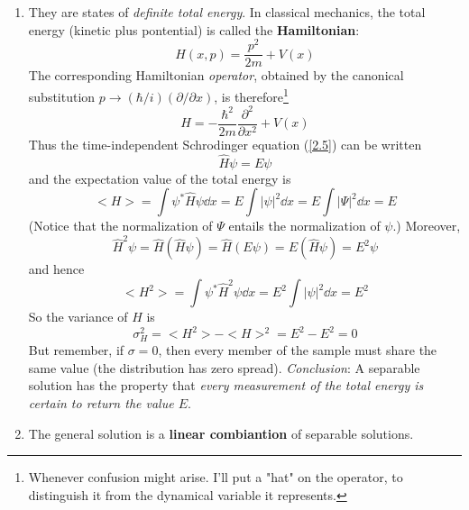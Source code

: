 \begin{enumerate}
\item They are states of \textit{definite total energy}. In classical mechanics, the total energy (kinetic plus pontential) is called the \textbf{Hamiltonian}:
	\begin{equation}\label{2.10}
	H(x,p)=\frac{p^2}{2m}+V(x)
\end{equation}
The corresponding Hamiltonian \textit{operator}, obtained by the canonical substitution $p\to (\hbar/i)(\partial /\partial x)$, is therefore\footnote{Whenever confusion might arise. I'll put a "hat" on the operator, to distinguish it from the dynamical variable it represents.}
\begin{equation}\label{2.11}
	\hat{H}=-\frac{\hbar^2}{2m}\frac{\partial^2}{\partial x^2}+V(x)
\end{equation}
Thus the time-independent Schrodinger equation (\ref{2.5}) can be written
\begin{equation}\label{2.12}
	\hat{H}\psi=E\psi
\end{equation}
and the expectation value of the total energy is
\begin{equation}\label{2.13}
	<H>=\int\psi^*\hat{H}\psi\dd x=E\int |\psi|^2\dd x=E\int |\Psi|^2\dd x=E
\end{equation}
(Notice that the normalization of $\Psi$ entails the normalization of $\psi$.) Moreover,
$$\hat{H}^2\psi=\hat{H}(\hat{H}\psi)=\hat{H}(E\psi)=E(\hat{H}\psi)=E^2\psi$$ and hence $$<H^2>=\int\psi^*\hat{H}^2\psi\dd x=E^2\int|\psi|^2\dd x=E^2$$ So the variance of $H$ is 
\begin{equation}\label{2.14}
	\sigma_H^2=<H^2>-<H>^2=E^2-E^2=0
\end{equation}
But remember, if $\sigma=0$, then every member of the sample must share the same value (the distribution has zero spread). \textit{Conclusion}: A separable solution has the property that \textit{every measurement of the total energy is certain to return the value $E$}.

\item The general solution is a \textbf{linear combiantion} of separable solutions.


\end{enumerate}


